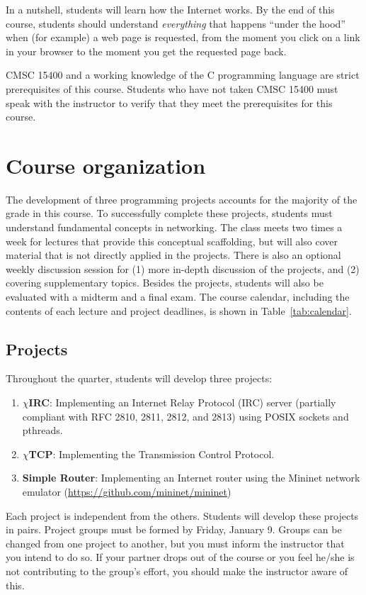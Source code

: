 \documentclass[11pt]{article}
\newcommand{\chirc}{$\chi$\textsf{IRC}}
\newcommand{\chitcp}{$\chi$\textsf{TCP}}
\begin{document}
In a nutshell, students will learn how the Internet works. By the end of this course, students should understand \emph{everything} that happens ``under the hood'' when (for example) a web page is requested, from the moment you click on a link in your browser to the moment you get the requested page back.

CMSC 15400 and a working knowledge of the C programming language are strict prerequisites of this course. Students who have not taken CMSC 15400 must speak with the instructor to verify that they meet the prerequisites for this course.

\section{Course organization}

The development of three programming projects accounts for the majority of the grade in this course. To successfully complete these projects, students must understand fundamental concepts in networking. The class meets two times a week for lectures that provide this conceptual scaffolding, but will also cover material that is not directly applied in the projects. There is also an optional weekly discussion session for (1) more in-depth discussion of the projects, and (2) covering supplementary topics. Besides the projects, students will also be evaluated with a midterm and a final exam. The course calendar, including the contents of each lecture and project deadlines, is shown in Table~\ref{tab:calendar}.

\subsection{Projects}

Throughout the quarter, students will develop three projects:

\begin{enumerate}
 \item \textbf{\chirc}: Implementing an Internet Relay Protocol (IRC) server (partially compliant with RFC 2810, 2811, 2812, and 2813) using POSIX sockets and pthreads.
 \item \textbf{\chitcp}: Implementing the Transmission Control Protocol.
 \item \textbf{Simple Router}: Implementing an Internet router using the Mininet network emulator (\url{https://github.com/mininet/mininet})
\end{enumerate}

Each project is independent from the others. Students will develop these projects in pairs. Project groups must be formed by Friday, January 9. Groups can be changed from one project to another, but you must inform the instructor that you intend to do so. If your partner drops out of the course or you feel he/she is not contributing to the group's effort, you should make the instructor aware of this.
\end{document}
